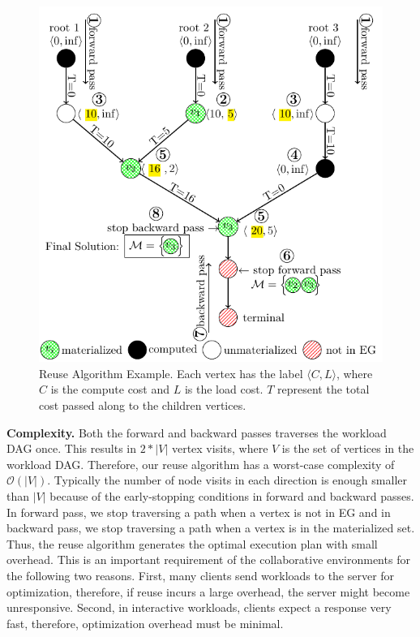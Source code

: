 \begin{figure}
\centering
\includegraphics[width=\linewidth]{../images/tikz-standalone/reuse-algorithm}
\caption{Reuse Algorithm Example. Each vertex has the label $\langle C,L \rangle$, where $C$ is the compute cost and $L$ is the load cost. $T$ represent the total cost passed along to the children vertices.}
\label{fig-reuse-algorithm}
\end{figure}


\textbf{Complexity.} 
Both the forward and backward passes traverses the workload DAG once.
This results in $2*|V|$ vertex visits, where $V$ is the set of vertices in the workload DAG.
Therefore, our reuse algorithm has a worst-case complexity of $\mathcal{O}(|V|)$.
Typically the number of node visits in each direction is enough smaller than $|V|$ because of the early-stopping conditions in forward and backward passes.
In forward pass, we stop traversing a path when a vertex is not in EG and in backward pass, we stop traversing a path when a vertex is in the materialized set.
Thus, the reuse algorithm generates the optimal execution plan with small overhead.
This is an important requirement of the collaborative environments for the following two reasons.
First, many clients send workloads to the server for optimization, therefore, if reuse incurs a large overhead, the server might become unresponsive.
Second, in interactive workloads, clients expect a response very fast, therefore, optimization overhead must be minimal.

